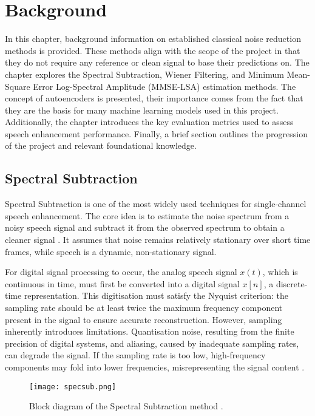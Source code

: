 \graphicspath{{content/chapters/2_background/figures/}}
\chapter{Background}
\label{chp:background}

In this chapter, background information on established classical noise reduction methods is provided. These methods align with the scope of the project in that they do not require any reference or clean signal to base their predictions on. The chapter explores the Spectral Subtraction, Wiener Filtering, and Minimum Mean-Square Error Log-Spectral Amplitude (MMSE-LSA) estimation methods. The concept of autoencoders is presented, their importance comes from the fact that they are the basis for many machine learning models used in this project. Additionally, the chapter introduces the key evaluation metrics used to assess speech enhancement performance. Finally, a brief section outlines the progression of the project and relevant foundational knowledge.


\section{Spectral Subtraction}
\label{sec:spectral_subtraction}

Spectral Subtraction is one of the most widely used techniques for single-channel speech enhancement. The core idea is to estimate the noise spectrum from a noisy speech signal and subtract it from the observed spectrum to obtain a cleaner signal \cite{loizou2013speech}. It assumes that noise remains relatively stationary over short time frames, while speech is a dynamic, non-stationary signal.

For digital signal processing to occur, the analog speech signal \(x(t)\), which is continuous in time, must first be converted into a digital signal \(x[n]\), a discrete-time representation. This digitisation must satisfy the Nyquist criterion: the sampling rate should be at least twice the maximum frequency component present in the signal to ensure accurate reconstruction. However, sampling inherently introduces limitations. Quantisation noise, resulting from the finite precision of digital systems, and aliasing, caused by inadequate sampling rates, can degrade the signal. If the sampling rate is too low, high-frequency components may fold into lower frequencies, misrepresenting the signal content \cite{loizou2013speech}.

\begin{figure}[h]
    \centering
    \texttt{[image: specsub.png]}
    \caption{\label{fig:SSBlock} Block diagram of the Spectral Subtraction method \cite{dubey2016evaluation}.}
\end{figure}

